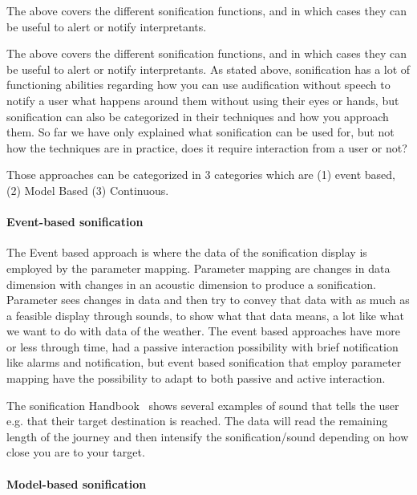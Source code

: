 
The above covers the different sonification functions, and in which cases they can be useful to alert or notify interpretants.

The above covers the different sonification functions, and in which cases they can be useful to alert or notify interpretants.
As stated above, sonification has a lot of functioning abilities regarding how you can use audification without speech to notify a user what happens around them without using their eyes or hands, but sonification can also be categorized in their techniques and how you approach them. 
So far we have only explained what sonification can be used for, but not how the techniques are in practice, does it require interaction from a user or not?

Those approaches can be categorized in 3 categories which are (1) event based, (2) Model Based (3) Continuous.


\paragraph{Event-based sonification} %
\label{par:event_based_sonification}

The Event based approach is where the data of the sonification display is employed by the parameter mapping. 
Parameter mapping are changes in data dimension with changes in an acoustic dimension to produce a sonification. 
Parameter sees changes in data and then try to convey that data with as much as a feasible display through sounds, to show what that data means, a lot like what we want to do with data of the weather. 
The event based approaches have more or less through time, had a passive interaction possibility with brief notification like alarms and notification, but event based sonification that employ parameter mapping have the possibility to adapt to both passive and active interaction.

The sonification Handbook~\cite[Ch. 15]{Hermann2011} shows several examples of sound that tells the user e.g. that their target destination is reached.
The data will read the remaining length of the journey and then intensify the sonification/sound depending on how close you are to your target.



\paragraph{Model-based sonification} %
\label{par:analysis_model_based_sonification}

